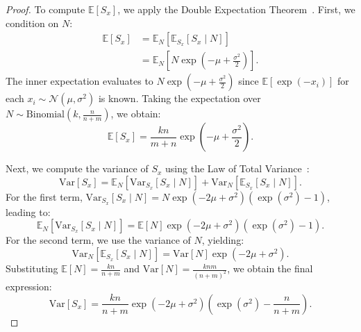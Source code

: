 \begin{proof}
    To compute $\mathbb{E}[S_x]$, we apply the Double Expectation Theorem~\cite{rice2007mathematical}. First, we condition on $N$:
    \begin{equation*}
        \begin{aligned}
            \mathbb{E}[S_x] &= \mathbb{E}_{N}\left[ \mathbb{E}_{S_x}[S_x \mid N] \right] \\
            &= \mathbb{E}_{N}\left[ N \exp\left(-\mu + \frac{\sigma^2}{2}\right) \right].
        \end{aligned}
    \end{equation*}
    The inner expectation evaluates to $N \exp\left(-\mu + \frac{\sigma^2}{2}\right)$ since $\mathbb{E}[\exp(-x_i)]$ for each $x_i \sim \mathcal{N}(\mu, \sigma^2)$ is known. Taking the expectation over $N \sim \mathrm{Binomial}(k, \frac{n}{n+m})$, we obtain:
    \begin{equation*}
        \mathbb{E}[S_x] = \frac{kn}{m+n} \exp\left(-\mu + \frac{\sigma^2}{2}\right).
    \end{equation*}

    Next, we compute the variance of $S_x$ using the Law of Total Variance~\cite{chung2000course}:
    \begin{equation*}
        \mathrm{Var}[S_x] = \mathbb{E}_{N}\left[ \mathrm{Var}_{S_x}[S_x \mid N] \right] + \mathrm{Var}_{N}\left[ \mathbb{E}_{S_x}[S_x \mid N] \right].
    \end{equation*}
    For the first term, $\mathrm{Var}_{S_x}[S_x \mid N] = N \exp(-2\mu + \sigma^2) \left( \exp(\sigma^2) - 1 \right)$, leading to:
    \begin{equation*}
        \mathbb{E}_{N}\left[ \mathrm{Var}_{S_x}[S_x \mid N] \right] = \mathbb{E}[N] \exp(-2\mu + \sigma^2) \left( \exp(\sigma^2) - 1 \right).
    \end{equation*}
    For the second term, we use the variance of $N$, yielding:
    \begin{equation*}
        \mathrm{Var}_{N}\left[ \mathbb{E}_{S_x}[S_x \mid N] \right] = \mathrm{Var}[N] \exp(-2\mu + \sigma^2).
    \end{equation*}
    Substituting $\mathbb{E}[N] = \frac{kn}{n+m}$ and $\mathrm{Var}[N] = \frac{knm}{(n+m)^2}$, we obtain the final expression:
    \begin{equation*}
        \mathrm{Var}[S_x] = \frac{kn}{n+m} \exp(-2\mu + \sigma^2) \left( \exp(\sigma^2) - \frac{n}{n+m} \right).
    \end{equation*}
\end{proof}

